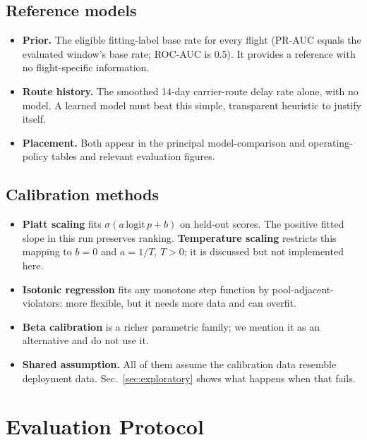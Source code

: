 \documentclass[conference]{IEEEtran}
\begin{document}
\subsection{Reference models}
\begin{itemize}
\item \textbf{Prior.} The eligible fitting-label base rate for every flight (PR-AUC equals the evaluated window's base rate; ROC-AUC is 0.5). It provides a reference with no flight-specific information.
\item \textbf{Route history.} The smoothed 14-day carrier-route delay rate alone, with no model. A learned model must beat this simple, transparent heuristic to justify itself.
\item \textbf{Placement.} Both appear in the principal model-comparison and operating-policy tables and relevant evaluation figures.
\end{itemize}

\subsection{Calibration methods}
\begin{itemize}
\item \textbf{Platt scaling} \cite{platt1999} fits $\sigma(a\,\mathrm{logit}\,p+b)$ on held-out scores. The positive fitted slope in this run preserves ranking. \textbf{Temperature scaling} \cite{guo2017calibration} restricts this mapping to $b=0$ and $a=1/T$, $T>0$; it is discussed but not implemented here.
\item \textbf{Isotonic regression} \cite{zadrozny2002,niculescu2005} fits any monotone step function by pool-adjacent-violators: more flexible, but it needs more data and can overfit.
\item \textbf{Beta calibration} \cite{kull2017beta} is a richer parametric family; we mention it as an alternative and do not use it.
\item \textbf{Shared assumption.} All of them assume the calibration data resemble deployment data. Sec.~\ref{sec:exploratory} shows what happens when that fails.
\end{itemize}

\section{Evaluation Protocol}\label{sec:protocol}
\end{document}
